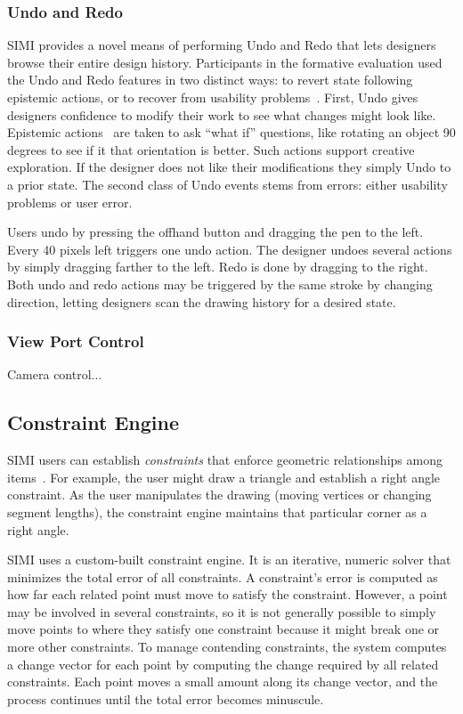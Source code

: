 \documentclass{article}
\begin{document}
\subsubsection{Undo and Redo}

SIMI provides a novel means of performing Undo and Redo that lets
designers browse their entire design history. Participants in the
formative evaluation used the Undo and Redo features in two distinct
ways: to revert state following epistemic actions, or to recover from
usability problems~\cite{akers-undo}. First, Undo gives designers
confidence to modify their work to see what changes might look
like. Epistemic actions~\cite{kirsch-epistemic-action} are taken to
ask ``what if'' questions, like rotating an object 90 degrees to see
if it that orientation is better. Such actions support creative
exploration. If the designer does not like their modifications they
simply Undo to a prior state. The second class of Undo events stems
from errors: either usability problems or user error. 

Users undo by pressing the offhand button and dragging the pen to the
left. Every 40 pixels left triggers one undo action. The designer
undoes several actions by simply dragging farther to the left. Redo is
done by dragging to the right. Both undo and redo actions may be
triggered by the same stroke by changing direction, letting designers
scan the drawing history for a desired state.

\subsubsection{View Port Control}

Camera control...

\subsection{Constraint Engine}

SIMI users can establish \textit{constraints} that enforce geometric
relationships among items~\cite{borning-thinglab}. For example, the
user might draw a triangle and establish a right angle constraint. As
the user manipulates the drawing (moving vertices or changing segment
lengths), the constraint engine maintains that particular corner as a
right angle.

SIMI uses a custom-built constraint engine. It is an iterative,
numeric solver that minimizes the total error of all constraints. A
constraint's error is computed as how far each related point must move
to satisfy the constraint. However, a point may be involved in several
constraints, so it is not generally possible to simply move points to
where they satisfy one constraint because it might break one or more
other constraints. To manage contending constraints, the system
computes a change vector for each point by computing the change
required by all related constraints. Each point moves a small amount
along its change vector, and the process continues until the total
error becomes minuscule.
\end{document}
